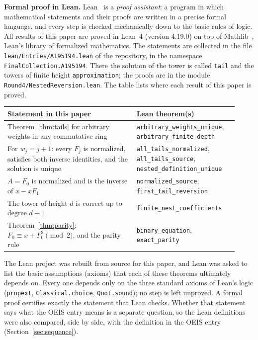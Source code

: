 \documentclass[11pt,a4paper]{article}
\theoremstyle{definition}
\theoremstyle{remark}
\newcommand{\para}[1]{\par\medskip\noindent\textbf{#1}\enspace}
\begin{document}
\para{Formal proof in Lean.}
Lean~\cite{lean} is a \emph{proof assistant}: a program in which mathematical statements and their proofs are written
in a precise formal language, and every step is checked mechanically down to the basic rules of logic. All results of
this paper are proved in Lean~4 (version 4.19.0) on top of Mathlib~\cite{mathlib}, Lean's library of formalized
mathematics. The statements are collected in the file \texttt{lean/Entries/A195194.lean} of the repository,
in the namespace \texttt{FinalCollection.A195194}. There the solution of the tower is called \texttt{tail} and the towers of finite height \texttt{approximation}; the proofs are in the module \texttt{Round4/NestedReversion.lean}.
The table lists where each result of this paper is proved.
\begin{center}\small\renewcommand{\arraystretch}{1.25}
\begin{tabular}{>{\raggedright\arraybackslash}p{0.52\linewidth}>{\raggedright\arraybackslash}p{0.4\linewidth}}
\toprule
Statement in this paper & Lean theorem(s)\\
\midrule
Theorem~\ref{thm:tails} for arbitrary weights in any commutative ring & \texttt{arbitrary\_\allowbreak{}weights\_\allowbreak{}unique}, \texttt{arbitrary\_\allowbreak{}finite\_\allowbreak{}depth} \\
For $w_j=j+1$: every $F_j$ is normalized, satisfies both inverse identities, and the solution is unique & \texttt{all\_\allowbreak{}tails\_\allowbreak{}normalized}, \texttt{all\_\allowbreak{}tails\_\allowbreak{}source}, \texttt{nested\_\allowbreak{}definition\_\allowbreak{}unique} \\
$A=F_0$ is normalized and is the inverse of $x-xF_1$ & \texttt{normalized\_\allowbreak{}source}, \texttt{first\_\allowbreak{}tail\_\allowbreak{}reversion} \\
The tower of height $d$ is correct up to degree $d+1$ & \texttt{finite\_\allowbreak{}nest\_\allowbreak{}coefficients} \\
Theorem~\ref{thm:parity}: $F_0\equiv x+F_0^2\pmod2$, and the parity rule & \texttt{binary\_\allowbreak{}equation}, \texttt{exact\_\allowbreak{}parity} \\
\bottomrule
\end{tabular}
\end{center}
The Lean project was rebuilt from source for this paper, and Lean was asked to list the basic assumptions (axioms)
that each of these theorems ultimately depends on. Every one depends only on the three standard axioms of Lean's logic
(\texttt{propext}, \texttt{Classical.choice}, \texttt{Quot.sound}); no step is left unproved. A formal proof certifies
exactly the statement that Lean checks. Whether that statement says what the OEIS entry means is a separate question,
so the Lean definitions were also compared, side by side, with the definition in the OEIS entry
(Section~\ref{sec:sequence}).
\end{document}
